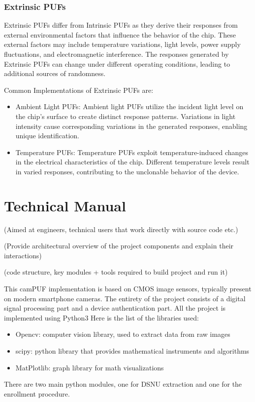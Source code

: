 \documentclass{article}
\begin{document}
\subsubsection{Extrinsic PUFs}

Extrinsic PUFs differ from Intrinsic PUFs as they derive their responses from external environmental factors that influence the behavior of the chip. These external factors may include temperature variations, light levels, power supply fluctuations, and electromagnetic interference. The responses generated by Extrinsic PUFs can change under different operating conditions, leading to additional sources of randomness.

Common Implementations of Extrinsic PUFs are:
\begin{itemize}
\item Ambient Light PUFs: Ambient light PUFs utilize the incident light level on the chip's surface to create distinct response patterns. Variations in light intensity cause corresponding variations in the generated responses, enabling unique identification.

\item Temperature PUFs: Temperature PUFs exploit temperature-induced changes in the electrical characteristics of the chip. Different temperature levels result in varied responses, contributing to the unclonable behavior of the device.
\end{itemize}
\section{\textbf{Technical Manual}}
(Aimed at engineers, technical users that work directly with source code etc.)

(Provide architectural overview of the project components and explain their interactions)

(code structure, key modules + tools required to build project and run it)

This camPUF implementation is based on CMOS image sensors, typically present on modern smartphone cameras.
The entirety of the project consists of a digital signal processing part and a device authentication part.
All the project is implemented using Python3
Here is the list of the libraries used:

\begin{itemize}
\item Opencv: computer vision library, used to extract data from raw images 
\item scipy: python library that provides mathematical instruments and algorithms
\item MatPlotlib: graph library for math visualizations
\end{itemize}

There are two main python modules, one for DSNU extraction and one for the enrollment procedure.
\end{document}
